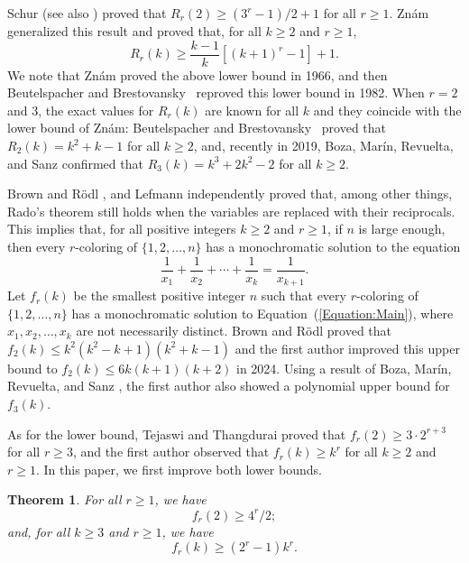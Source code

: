 \documentclass[11pt]{article}
\newtheorem{theorem}{Theorem}[section]
\theoremstyle{definition}
\begin{document}
Schur \cite{Schur1916} (see also \cite[Theorem 8.9]{LandmanRobertson2014}) proved that $R_r(2)\geq(3^r-1)/2+1$ for all $r\geq1$. Zn\'{a}m \cite{Znam1966} generalized this result and proved that, for all $k\geq2$ and $r\geq1$,
\[
R_r(k)\geq\frac{k-1}{k}\left[(k+1)^r-1\right]+1.
\]
We note that Zn\'{a}m \cite{Znam1966} proved the above lower bound in 1966, and then Beutelspacher and Brestovansky~\cite{BeutelspacherBrestovansky1982} reproved this lower bound in 1982. When $r=2$ and $3$, the exact values for $R_r(k)$ are known for all $k$ and they coincide with the lower bound of Zn\'{a}m: Beutelspacher and Brestovansky~\cite{BeutelspacherBrestovansky1982} proved that $R_2(k)=k^2+k-1$ for all $k\geq2$, and, recently in 2019, Boza, Mar\'{i}n, Revuelta, and Sanz \cite{BMRS2019} confirmed that $R_3(k)=k^3+2k^2-2$ for all $k\geq2$.

Brown and R\"{o}dl \cite{BrownRodl1991}, and Lefmann \cite{Lefmann1991} independently proved that, among other things, Rado's theorem still holds when the variables are replaced with their reciprocals. This implies that, for all positive integers $k\geq2$ and $r\geq1$, if $n$ is large enough, then every $r$-coloring of $\{1,2,\ldots,n\}$ has a monochromatic solution to the equation
\begin{equation}\label{Equation:Main}
\frac{1}{x_1}+\frac{1}{x_2}+\cdots+\frac{1}{x_k}=\frac{1}{x_{k+1}}.
\end{equation}
Let $f_r(k)$ be the smallest positive integer $n$ such that every $r$-coloring of $\{1,2,\ldots,n\}$ has a monochromatic solution to Equation~(\ref{Equation:Main}), where $x_1,x_2,\ldots,x_k$ are not necessarily distinct. Brown and R\"{o}dl \cite{BrownRodl1991} proved that $f_2(k)\leq k^2(k^2-k+1)(k^2+k-1)$ and the first author \cite{Gaiser2024} improved this upper bound to $f_2(k)\leq6k(k+1)(k+2)$ in 2024. Using a result of Boza, Mar\'{i}n, Revuelta, and Sanz \cite{BMRS2019}, the first author \cite{Gaiser2024} also showed a polynomial upper bound for $f_3(k)$.

As for the lower bound, Tejaswi and Thangdurai \cite{TejaswiThangadurai2002} proved that $f_r(2)\geq3\cdot2^{r+3}$ for all $r\geq3$, and the first author \cite{Gaiser2024} observed that $f_r(k)\geq k^r$ for all $k\geq2$ and $r\geq1$. In this paper, we first improve both lower bounds.
\begin{theorem}\label{Theorem:Main}
For all $r\geq1$, we have
\[
f_r(2)\geq 4^r/2;
\]
and, for all $k\geq3$ and $r\geq1$, we have \[f_r(k)\geq(2^r-1)k^r.\]
\end{theorem}
\end{document}
